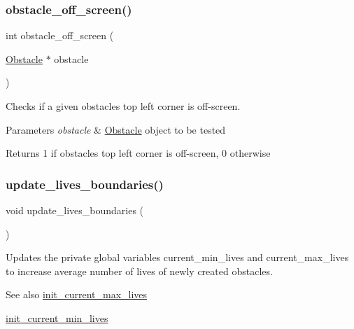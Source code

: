 \subsubsection{\texorpdfstring{obstacle\+\_\+off\+\_\+screen()}{obstacle\_off\_screen()}}
{\footnotesize\ttfamily int obstacle\+\_\+off\+\_\+screen (\begin{DoxyParamCaption}\item[{\hyperlink{struct_obstacle}{Obstacle} $\ast$}]{obstacle }\end{DoxyParamCaption})}



Checks if a given obstacle\textquotesingle{}s top left corner is off-\/screen. 


\begin{DoxyParams}{Parameters}
{\em obstacle} & \hyperlink{struct_obstacle}{Obstacle} \textquotesingle{}object\textquotesingle{} to be tested \\
\hline
\end{DoxyParams}
\begin{DoxyReturn}{Returns}
1 if obstacle\textquotesingle{}s top left corner is off-\/screen, 0 otherwise 
\end{DoxyReturn}
\hypertarget{group__obstacle_ga6adaec54db6dd05a4bcdfb2abece7f98}{}\label{group__obstacle_ga6adaec54db6dd05a4bcdfb2abece7f98} 
\subsubsection{\texorpdfstring{update\+\_\+lives\+\_\+boundaries()}{update\_lives\_boundaries()}}
{\footnotesize\ttfamily void update\+\_\+lives\+\_\+boundaries (\begin{DoxyParamCaption}{ }\end{DoxyParamCaption})}



Updates the private global variables current\+\_\+min\+\_\+lives and current\+\_\+max\+\_\+lives to increase average number of lives of newly created obstacles. 

\begin{DoxySeeAlso}{See also}
\hyperlink{group__obstacle_ga12e6975f62f13cef3f04d4014ac31242}{init\+\_\+current\+\_\+max\+\_\+lives} 

\hyperlink{group__obstacle_gae8c5264a98edf73e34cc59b0d79ee5b8}{init\+\_\+current\+\_\+min\+\_\+lives} 
\end{DoxySeeAlso}
\hypertarget{group__obstacle_gaf9a8875cab767c12b00817ed1b62ae4f}{}\label{group__obstacle_gaf9a8875cab767c12b00817ed1b62ae4f} 
